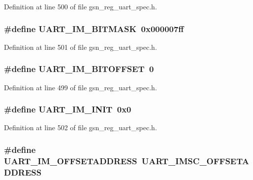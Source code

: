 Definition at line 500 of file gsn\_\-reg\_\-uart\_\-spec.h.

\hypertarget{a00575_a1fe7f0b70bc5cc610072182dafcc6dac}{
\subsubsection[{UART\_\-IM\_\-BITMASK}]{\setlength{\rightskip}{0pt plus 5cm}\#define UART\_\-IM\_\-BITMASK~0x000007ff}}
\label{a00575_a1fe7f0b70bc5cc610072182dafcc6dac}


Definition at line 501 of file gsn\_\-reg\_\-uart\_\-spec.h.

\hypertarget{a00575_ae44c8152da0a8c82b602253fb3c04ab9}{
\subsubsection[{UART\_\-IM\_\-BITOFFSET}]{\setlength{\rightskip}{0pt plus 5cm}\#define UART\_\-IM\_\-BITOFFSET~0}}
\label{a00575_ae44c8152da0a8c82b602253fb3c04ab9}


Definition at line 499 of file gsn\_\-reg\_\-uart\_\-spec.h.

\hypertarget{a00575_a514c92778c433cb96b10e7b4f150bf8b}{
\subsubsection[{UART\_\-IM\_\-INIT}]{\setlength{\rightskip}{0pt plus 5cm}\#define UART\_\-IM\_\-INIT~0x0}}
\label{a00575_a514c92778c433cb96b10e7b4f150bf8b}


Definition at line 502 of file gsn\_\-reg\_\-uart\_\-spec.h.

\hypertarget{a00575_a585c72a276d29520208196a93d385960}{
\subsubsection[{UART\_\-IM\_\-OFFSETADDRESS}]{\setlength{\rightskip}{0pt plus 5cm}\#define UART\_\-IM\_\-OFFSETADDRESS~UART\_\-IMSC\_\-OFFSETADDRESS}}
\label{a00575_a585c72a276d29520208196a93d385960}


